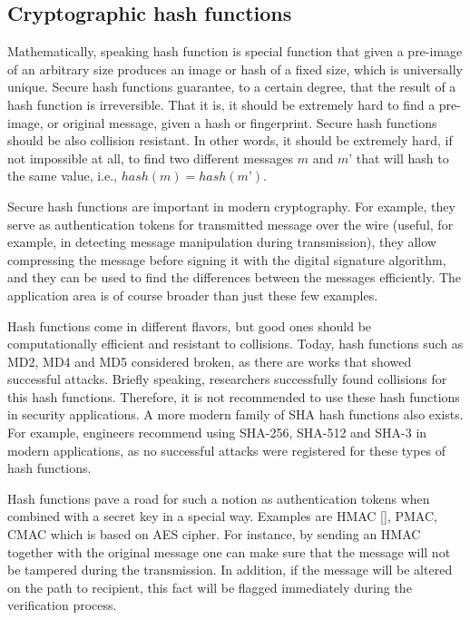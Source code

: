 \subsection{Cryptographic hash functions}

Mathematically, speaking hash function is special function that given a 
pre-image of an arbitrary size produces an image or hash of a fixed size, 
which is universally unique. Secure hash functions guarantee, to a certain 
degree, that the result of a hash function is irreversible. That it is, it 
should be extremely hard to find a pre-image, or original message, given a 
hash or fingerprint. Secure hash functions should be also collision resistant. 
In other words, it should be extremely hard, if not impossible at all, to 
find two different messages $m$ and $m’$ that will hash to the same value, i.e., 
$hash(m)=hash(m’)$.

Secure hash functions are important in modern cryptography. 
For example, they serve as authentication tokens for transmitted message over the 
wire (useful, for example, in detecting message manipulation during transmission), 
they allow compressing the message before signing it with the digital signature 
algorithm, and they can be used to find the differences between the messages 
efficiently. The application area is of course broader than just these few examples. 

Hash functions come in different flavors, but good ones should be computationally 
efficient and resistant to collisions. Today, hash functions such as MD2, MD4 and MD5 
considered broken, as there are works that showed successful attacks. Briefly speaking, 
researchers successfully found collisions for this hash functions. Therefore, it is 
not recommended to use these hash functions in security applications. A more modern 
family of SHA hash functions also exists. For example, engineers recommend using SHA-256, 
SHA-512 and SHA-3 in modern applications, as no successful attacks were registered for 
these types of hash functions.

Hash functions pave a road for such a notion as authentication tokens when combined with a 
secret key in a special way. Examples are HMAC [], PMAC, CMAC which is based on AES cipher. 
For instance, by sending an HMAC together with the original message one can make sure that 
the message will not be tampered during the transmission. In addition, if the message will 
be altered on the path to recipient, this fact will be flagged immediately during the 
verification process.

